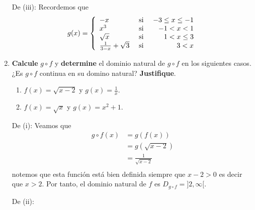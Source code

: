 \documentclass[12pt]{article}
\begin{document}
\begin{enumerate}
\begin{sol}
        De (iii): Recordemos que
        \begin{equation*}
            g(x)=\left\{
                \begin{array}{lcr}
                    -x & \textup{ si } & -3\leq x\leq-1\\
                    x^3 & \textup{ si } & -1< x<1\\
                    \sqrt{x} & \textup{ si } & 1<x\leq3 \\
                    \frac{1}{3-x}+\sqrt{3} & \textup{ si } & 3<x\\ 
                \end{array}
            \right.
        \end{equation*}
    \end{sol}

    \item \textbf{Calcule} $g\circ f$ y \textbf{determine} el dominio natural de $g\circ f$ en los siguientes casos. ¿Es $g\circ f$ continua en su domino natural? \textbf{Justifique}.
    \begin{enumerate}
        \item $f(x)=\sqrt{x-2}$ y $g(x)=\frac{1}{x}$.
        \item $f(x)=\sqrt{x}$ y $g(x)=x^2+1$.
    \end{enumerate}

    \begin{sol}
        De (i): Veamos que
        \begin{equation*}
            \begin{split}
                g\circ f(x)&=g(f(x))\\
                &=g\left(\sqrt{x-2}\right)\\
                &=\frac{1}{\sqrt{x-2}}\\
            \end{split}
        \end{equation*}
        notemos que esta función está bien definida siempre que $x-2>0$ es decir que $x>2$. Por tanto, el dominio natural de $f$ es $D_{g\circ f}=]2,\infty[$.

        De (ii): %
    \end{sol}


\end{enumerate}
\end{document}
